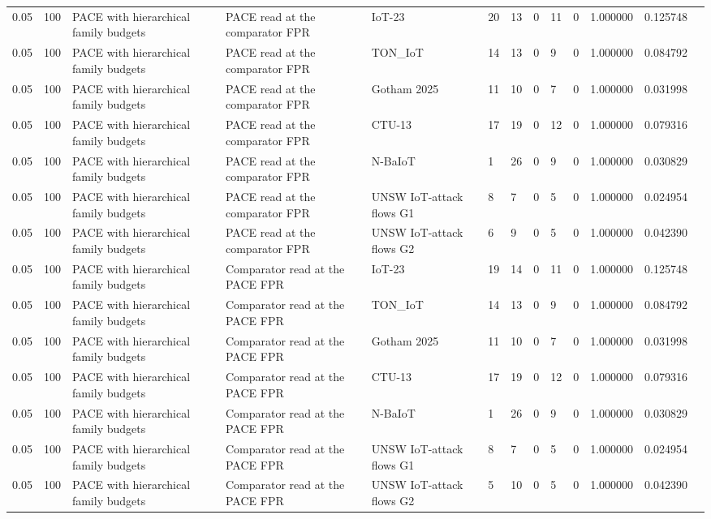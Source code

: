 \begin{tabular}{lllllllllllll}
0.05 & 100 & PACE with hierarchical family budgets & PACE read at the comparator FPR & IoT-23 & 20 & 13 & 0 & 11 & 0 & 1.000000 & 0.125748 &  \\
0.05 & 100 & PACE with hierarchical family budgets & PACE read at the comparator FPR & TON\_IoT & 14 & 13 & 0 & 9 & 0 & 1.000000 & 0.084792 &  \\
0.05 & 100 & PACE with hierarchical family budgets & PACE read at the comparator FPR & Gotham 2025 & 11 & 10 & 0 & 7 & 0 & 1.000000 & 0.031998 &  \\
0.05 & 100 & PACE with hierarchical family budgets & PACE read at the comparator FPR & CTU-13 & 17 & 19 & 0 & 12 & 0 & 1.000000 & 0.079316 &  \\
0.05 & 100 & PACE with hierarchical family budgets & PACE read at the comparator FPR & N-BaIoT & 1 & 26 & 0 & 9 & 0 & 1.000000 & 0.030829 &  \\
0.05 & 100 & PACE with hierarchical family budgets & PACE read at the comparator FPR & UNSW IoT-attack flows G1 & 8 & 7 & 0 & 5 & 0 & 1.000000 & 0.024954 &  \\
0.05 & 100 & PACE with hierarchical family budgets & PACE read at the comparator FPR & UNSW IoT-attack flows G2 & 6 & 9 & 0 & 5 & 0 & 1.000000 & 0.042390 &  \\
0.05 & 100 & PACE with hierarchical family budgets & Comparator read at the PACE FPR & IoT-23 & 19 & 14 & 0 & 11 & 0 & 1.000000 & 0.125748 &  \\
0.05 & 100 & PACE with hierarchical family budgets & Comparator read at the PACE FPR & TON\_IoT & 14 & 13 & 0 & 9 & 0 & 1.000000 & 0.084792 &  \\
0.05 & 100 & PACE with hierarchical family budgets & Comparator read at the PACE FPR & Gotham 2025 & 11 & 10 & 0 & 7 & 0 & 1.000000 & 0.031998 &  \\
0.05 & 100 & PACE with hierarchical family budgets & Comparator read at the PACE FPR & CTU-13 & 17 & 19 & 0 & 12 & 0 & 1.000000 & 0.079316 &  \\
0.05 & 100 & PACE with hierarchical family budgets & Comparator read at the PACE FPR & N-BaIoT & 1 & 26 & 0 & 9 & 0 & 1.000000 & 0.030829 &  \\
0.05 & 100 & PACE with hierarchical family budgets & Comparator read at the PACE FPR & UNSW IoT-attack flows G1 & 8 & 7 & 0 & 5 & 0 & 1.000000 & 0.024954 &  \\
0.05 & 100 & PACE with hierarchical family budgets & Comparator read at the PACE FPR & UNSW IoT-attack flows G2 & 5 & 10 & 0 & 5 & 0 & 1.000000 & 0.042390 &  \\

\end{tabular}
